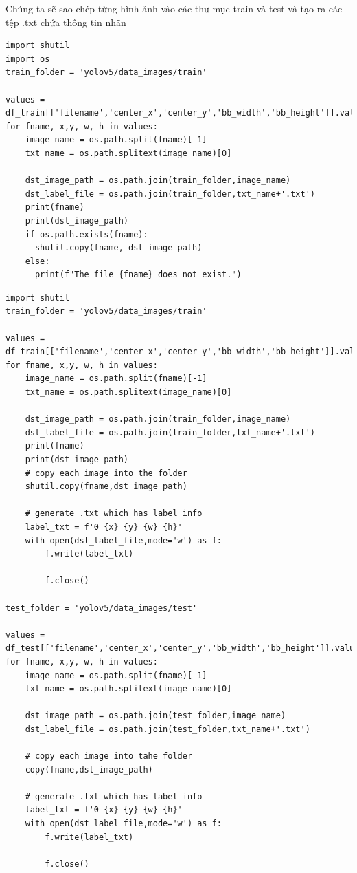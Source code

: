 \documentclass{article}
\begin{document}
Chúng ta sẽ sao chép từng hình ảnh vào các thư mục train và test và tạo ra các tệp .txt chứa thông tin nhãn
\begin{verbatim}
import shutil
import os
train_folder = 'yolov5/data_images/train'

values = df_train[['filename','center_x','center_y','bb_width','bb_height']].values
for fname, x,y, w, h in values:
    image_name = os.path.split(fname)[-1]
    txt_name = os.path.splitext(image_name)[0]

    dst_image_path = os.path.join(train_folder,image_name)
    dst_label_file = os.path.join(train_folder,txt_name+'.txt')
    print(fname)
    print(dst_image_path)
    if os.path.exists(fname):
      shutil.copy(fname, dst_image_path)
    else:
      print(f"The file {fname} does not exist.")
\end{verbatim}
\begin{verbatim}
import shutil
train_folder = 'yolov5/data_images/train'

values = df_train[['filename','center_x','center_y','bb_width','bb_height']].values
for fname, x,y, w, h in values:
    image_name = os.path.split(fname)[-1]
    txt_name = os.path.splitext(image_name)[0]

    dst_image_path = os.path.join(train_folder,image_name)
    dst_label_file = os.path.join(train_folder,txt_name+'.txt')
    print(fname)
    print(dst_image_path)
    # copy each image into the folder
    shutil.copy(fname,dst_image_path)

    # generate .txt which has label info
    label_txt = f'0 {x} {y} {w} {h}'
    with open(dst_label_file,mode='w') as f:
        f.write(label_txt)

        f.close()

test_folder = 'yolov5/data_images/test'

values = df_test[['filename','center_x','center_y','bb_width','bb_height']].values
for fname, x,y, w, h in values:
    image_name = os.path.split(fname)[-1]
    txt_name = os.path.splitext(image_name)[0]

    dst_image_path = os.path.join(test_folder,image_name)
    dst_label_file = os.path.join(test_folder,txt_name+'.txt')

    # copy each image into tahe folder
    copy(fname,dst_image_path)

    # generate .txt which has label info
    label_txt = f'0 {x} {y} {w} {h}'
    with open(dst_label_file,mode='w') as f:
        f.write(label_txt)

        f.close()
\end{verbatim}
\end{document}
